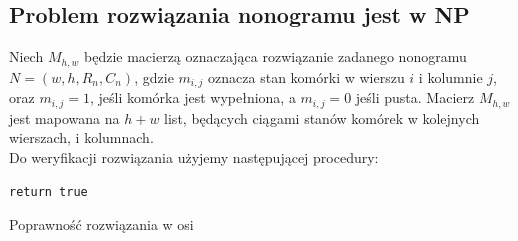 \subsection{Problem rozwiązania nonogramu jest w NP}
    Niech $M_{h, w}$ będzie macierzą oznaczająca rozwiązanie zadanego nonogramu $N = (w, h, R_n, C_n)$,
gdzie $m_{i, j}$ oznacza stan komórki w wierszu $i$ i kolumnie $j$, oraz $m_{i, j} = 1$, jeśli komórka
jest wypełniona, a $m_{i, j} = 0$ jeśli pusta. Macierz $M_{h, w}$ jest mapowana na $h + w$ list,
będących ciągami stanów komórek w kolejnych wierszach, i kolumnach.\\
    Do weryfikacji rozwiązania użyjemy następującej procedury:

\begin{pseudokod}[H]
    \texttt{return true}\;
    \caption{Poprawność rozwiązania w osi}\label{alg:axisValidation}
\end{pseudokod}

